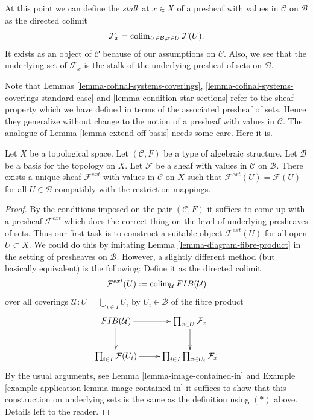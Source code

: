 \noindent
At this point we can define the {\it stalk} at $x \in X$
of a presheaf with values in $\mathcal{C}$ on $\mathcal{B}$
as the directed colimit
$$
\mathcal{F}_x = \mathop{\mathrm{colim}}\nolimits_{U\in \mathcal{B}, x\in U} \mathcal{F}(U).
$$
It exists as an object of $\mathcal{C}$
because of our assumptions on $\mathcal{C}$.
Also, we see that the underlying set of $\mathcal{F}_x$
is the stalk of the underlying presheaf of sets on $\mathcal{B}$.

\medskip\noindent
Note that Lemmas \ref{lemma-cofinal-systems-coverings},
\ref{lemma-cofinal-systems-coverings-standard-case} and
\ref{lemma-condition-star-sections} refer to the sheaf
property which we have defined in terms of the associated presheaf
of sets. Hence they generalize without change to the notion
of a presheaf with values in $\mathcal{C}$. The analogue of
Lemma \ref{lemma-extend-off-basis} needs some care. Here it is.

\begin{lemma}
\label{lemma-extend-off-basis-structures}
Let $X$ be a topological space. Let $(\mathcal{C}, F)$ be
a type of algebraic structure.
Let $\mathcal{B}$ be a basis for the topology on $X$.
Let $\mathcal{F}$ be a sheaf with values in $\mathcal{C}$
on $\mathcal{B}$.
There exists a unique sheaf $\mathcal{F}^{ext}$ with values in $\mathcal{C}$
on $X$ such that $\mathcal{F}^{ext}(U) = \mathcal{F}(U)$
for all $U \in \mathcal{B}$ compatibly with the restriction
mappings.
\end{lemma}

\begin{proof}
By the conditions imposed on the pair $(\mathcal{C}, F)$ it
suffices to come up with a presheaf $\mathcal{F}^{ext}$
which does the correct thing on the level of underlying
presheaves of sets. Thus our first task is to construct
a suitable object $\mathcal{F}^{ext}(U)$ for all open $U \subset X$.
We could do this by imitating
Lemma \ref{lemma-diagram-fibre-product} in the setting
of presheaves on $\mathcal{B}$. However, a slightly different method
(but basically equivalent) is the following:
Define it as the directed colimit
$$
\mathcal{F}^{ext}(U)
:=
\mathop{\mathrm{colim}}\nolimits_\mathcal{U} FIB(\mathcal{U})
$$
over all coverings
$\mathcal{U} : U = \bigcup_{i\in I} U_i$ by $U_i \in \mathcal{B}$
of the fibre product
$$
\xymatrix{
FIB(\mathcal{U}) \ar[r] \ar[d] &
\prod\nolimits_{x\in U} \mathcal{F}_x \ar[d] \\
\prod\nolimits_{i\in I} \mathcal{F}(U_i) \ar[r] &
\prod\nolimits_{i \in I} \prod\nolimits_{x\in U_i} \mathcal{F}_x
}
$$
By the usual arguments, see Lemma \ref{lemma-image-contained-in}
and Example \ref{example-application-lemma-image-contained-in}
it suffices to show that this construction on underlying
sets is the same as the definition using $(*)$ above.
Details left to the reader.
\end{proof}

